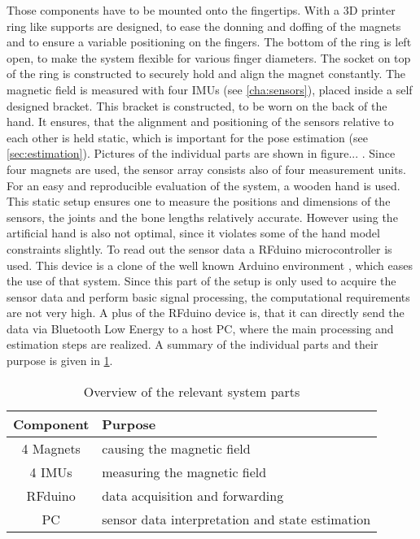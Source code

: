 Those components have to be mounted onto the fingertips. With a 3D printer ring like supports are designed, to ease the donning and doffing of the magnets and to ensure a variable positioning on the fingers. The bottom of the ring is left open, to make the system flexible for various finger diameters. The socket on top of the ring is constructed to securely hold and align the magnet constantly. The magnetic field is measured with four \acp{IMU} (see \ref{cha:sensors}), placed inside a self designed bracket. This bracket is constructed, to be worn on the back of the hand. It ensures, that the alignment and positioning of the sensors relative to each other is held static, which is important for the pose estimation (see \ref{sec:estimation}). Pictures of the individual parts are shown in figure... . Since four magnets are used, the sensor array consists also of four measurement units. For an easy and reproducible evaluation of the system, a wooden hand is used. This static setup ensures one to measure the positions and dimensions of the sensors, the joints and the bone lengths relatively accurate. However using the artificial hand is also not optimal, since it violates some of the hand model constraints slightly. To read out the sensor data a RFduino microcontroller  is used. This device is a clone of the well known Arduino environment , which eases the use of that system. Since this part of the setup is only used to acquire the sensor data and perform basic signal processing, the computational requirements are not very high. A plus of the RFduino device is, that it can directly send the data via Bluetooth Low Energy to a host PC, where the main processing and estimation steps are realized. A summary of the individual parts and their purpose is given in \ref{tab:systemParts}.

\begin{table}[h]
\centering
\begin{tabular}{|c|l|}
\hline
\textbf{Component} & \textbf{Purpose} \\ \hline
4 Magnets & causing the magnetic field \\ \hline
4 \acp{IMU} & measuring the magnetic field \\ \hline
RFduino & data acquisition and forwarding \\ \hline
PC & sensor data interpretation and state estimation \\ \hline
\end{tabular}
\caption{Overview of the relevant system parts}
\label{tab:systemParts}
\end{table}



